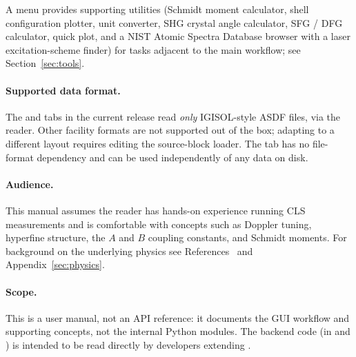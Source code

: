 A  menu provides supporting utilities (Schmidt moment
calculator, shell configuration plotter, unit converter, SHG crystal
angle calculator, SFG / DFG calculator, quick plot, and a NIST
Atomic Spectra Database browser with a laser excitation-scheme
finder) for tasks adjacent to the main workflow; see
Section~\ref{sec:tools}.

\paragraph{Supported data format.}
The  and  tabs in the current release
read \emph{only} IGISOL-style ASDF files, via the
~\cite{clstools} reader. Other facility formats are not
supported out of the box; adapting \denis{} to a different layout
requires editing the source-block loader. The  tab has
no file-format dependency and can be used independently of any data
on disk.

\paragraph{Audience.}
This manual assumes the reader has hands-on experience running CLS
measurements and is comfortable with concepts such as Doppler tuning,
hyperfine structure, the $A$ and $B$ coupling constants, and Schmidt
moments. For background on the underlying physics see
References~\cite{satlas2,cls_handbook} and
Appendix~\ref{sec:physics}.

\paragraph{Scope.}
This is a user manual, not an API reference: it documents the GUI
workflow and supporting concepts, not the internal Python modules. The
backend code (in  and ) is intended
to be read directly by developers extending \denis{}.
